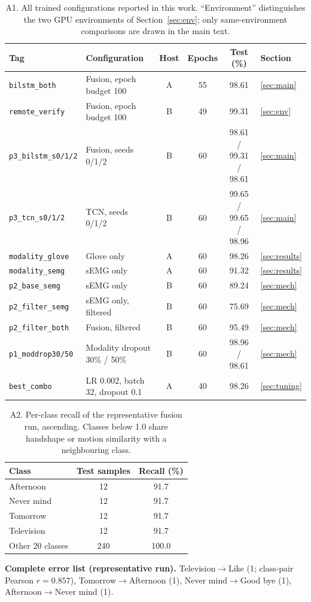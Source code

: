 \documentclass[11pt,a4paper]{article}
\begin{document}
\begin{table}[htbp]\centering
\caption{A1. All trained configurations reported in this work. ``Environment'' distinguishes the two GPU environments of Section~\ref{sec:env}; only same-environment comparisons are drawn in the main text.}
\label{tab:inventory}
\footnotesize
\setlength{\tabcolsep}{4pt}
\begin{tabular}{llcccl}
\toprule
Tag & Configuration & Host & Epochs & Test (\%) & Section \\
\midrule
\texttt{bilstm\_both} & Fusion, epoch budget 100 & A & 55 & 98.61 & \ref{sec:main} \\
\texttt{remote\_verify} & Fusion, epoch budget 100 & B & 49 & 99.31 & \ref{sec:env} \\
\texttt{p3\_bilstm\_s0/1/2} & Fusion, seeds 0/1/2 & B & 60 & 98.61 / 99.31 / 98.61 & \ref{sec:main} \\
\texttt{p3\_tcn\_s0/1/2} & TCN, seeds 0/1/2 & B & 60 & 99.65 / 99.65 / 98.96 & \ref{sec:main} \\
\texttt{modality\_glove} & Glove only & A & 60 & 98.26 & \ref{sec:results} \\
\texttt{modality\_semg} & sEMG only & A & 60 & 91.32 & \ref{sec:results} \\
\texttt{p2\_base\_semg} & sEMG only & B & 60 & 89.24 & \ref{sec:mech} \\
\texttt{p2\_filter\_semg} & sEMG only, filtered & B & 60 & 75.69 & \ref{sec:mech} \\
\texttt{p2\_filter\_both} & Fusion, filtered & B & 60 & 95.49 & \ref{sec:mech} \\
\texttt{p1\_moddrop30/50} & Modality dropout 30\% / 50\% & B & 60 & 98.96 / 98.61 & \ref{sec:mech} \\
\texttt{best\_combo} & LR 0.002, batch 32, dropout 0.1 & A & 40 & 98.26 & \ref{sec:tuning} \\
\bottomrule
\end{tabular}
\end{table}

\begin{table}[htbp]\centering
\caption{A2. Per-class recall of the representative fusion run, ascending. Classes below 1.0 share handshape or motion similarity with a neighbouring class.}
\label{tab:perclass}
\small
\begin{tabular}{lcc}
\toprule
Class & Test samples & Recall (\%) \\
\midrule
Afternoon & 12 & 91.7 \\
Never mind & 12 & 91.7 \\
Tomorrow & 12 & 91.7 \\
Television & 12 & 91.7 \\
Other 20 classes & 240 & 100.0 \\
\bottomrule
\end{tabular}
\end{table}

\noindent\textbf{Complete error list (representative run).} Television$\rightarrow$Like (1; class-pair Pearson $r=0.857$), Tomorrow$\rightarrow$Afternoon (1), Never mind$\rightarrow$Good bye (1), Afternoon$\rightarrow$Never mind (1).
\end{document}
